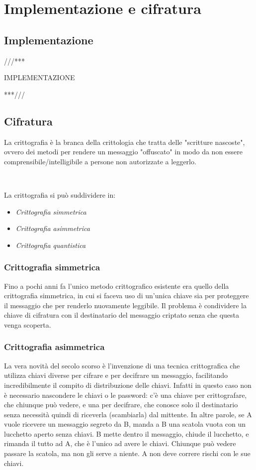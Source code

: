 \documentclass[a4paper,11pt]{book}
\begin{document}
\section{Implementazione e cifratura}

\subsection{Implementazione}


///***

IMPLEMENTAZIONE

***///


\subsection{Cifratura}

La crittografia è la branca della crittologia che tratta delle "scritture nascoste", ovvero dei metodi per rendere un messaggio "offuscato" in modo da non essere comprensibile/intelligibile a persone non autorizzate a leggerlo.

~

La crittografia si può suddividere in:
\begin{itemize}
	\item \textit{Crittografia simmetrica}

	\item \textit{Crittografia asimmetrica}

	\item \textit{Crittografia quantistica}

\end{itemize}

\subsubsection{Crittografia simmetrica}
Fino a pochi anni fa l'unico metodo crittografico esistente era quello della crittografia simmetrica, in cui si faceva uso di un'unica chiave sia per proteggere il messaggio che per renderlo nuovamente leggibile. Il problema è condividere la chiave di cifratura con il destinatario del messaggio criptato senza che questa venga scoperta.

\subsubsection{Crittografia asimmetrica}
La vera novità del secolo scorso è l'invenzione di una tecnica crittografica che utilizza chiavi diverse per cifrare e per decifrare un messaggio, facilitando incredibilmente il compito di distribuzione delle chiavi. Infatti in questo caso non è necessario nascondere le chiavi o le password: c'è una chiave per crittografare, che chiunque può vedere, e una per decifrare, che conosce solo il destinatario senza necessità quindi di riceverla (scambiarla) dal mittente. In altre parole, se A vuole ricevere un messaggio segreto da B, manda a B una scatola vuota con un lucchetto aperto senza chiavi. B mette dentro il messaggio, chiude il lucchetto, e rimanda il tutto ad A, che è l'unico ad avere le chiavi. Chiunque può vedere passare la scatola, ma non gli serve a niente. A non deve correre rischi con le sue chiavi.
\end{document}
